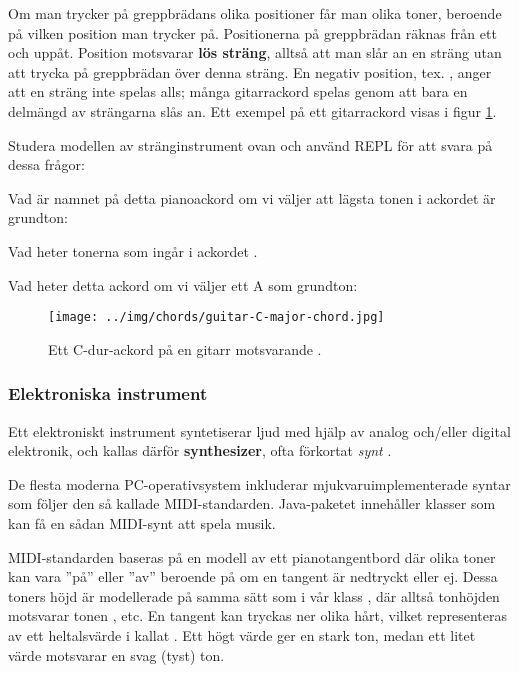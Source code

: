 {

Om man trycker på greppbrädans olika positioner får man olika toner, beroende på vilken position man trycker på. Positionerna på greppbrädan räknas från ett och uppåt. Position  motsvarar \textbf{lös sträng}, alltså att man slår an en sträng utan att trycka på greppbrädan över denna sträng. En negativ position, tex. , anger att en sträng inte spelas alls; många gitarrackord spelas genom att bara en delmängd av strängarna slås an.
Ett exempel på ett gitarrackord  visas i figur \ref{music:fig:guitar-chord}.

\Task\Pen Studera modellen av stränginstrument ovan och använd REPL för att svara på dessa frågor:

\Subtask Vad är namnet på detta pianoackord om vi väljer att lägsta tonen i ackordet är grundton: 

\Subtask Vad heter tonerna som ingår i ackordet .

\Subtask Vad heter detta ackord om vi väljer ett A som grundton: 


\begin{figure}
  \centering
  \texttt{[image: ../img/chords/guitar-C-major-chord.jpg]}
  \caption{Ett C-dur-ackord på en gitarr motsvarande .}
  \label{music:fig:guitar-chord}
\end{figure}


\subsubsection{Elektroniska instrument}

Ett elektroniskt instrument syntetiserar ljud med hjälp av analog och/eller digital elektronik, och kallas därför \textbf{synthesizer}, ofta förkortat \emph{synt} .

De flesta moderna PC-operativsystem inkluderar mjukvaruimplementerade syntar som följer den så kallade MIDI-standarden. Java-paketet  innehåller klasser som kan få en sådan MIDI-synt att spela musik.

MIDI-standarden baseras på en modell av ett pianotangentbord där olika toner kan vara ''på'' eller ''av'' beroende på om en tangent är nedtryckt eller ej. Dessa toners höjd är modellerade på samma sätt som i vår klass , där alltså tonhöjden  motsvarar tonen , etc. En tangent kan tryckas ner olika hårt, vilket representeras av ett heltalsvärde i  kallat . Ett högt värde ger en stark ton, medan ett litet värde motsvarar en svag (tyst) ton.

}
